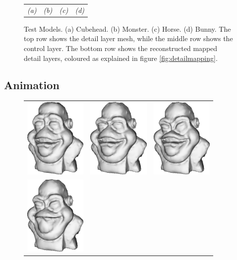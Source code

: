 \begin{figure}
\begin{center}
\begin{tabular}{cccc}
{\it (a)} & {\it (b)} & {\it (c)} & {\it (d)} 
\end{tabular}
\caption[Test Models]{\label{fig:models} Test Models. (a) Cubehead. (b) Monster. (c) Horse. (d) Bunny. The top row shows the detail layer mesh, while the middle row shows the control layer. The bottom row shows the reconstructed mapped detail layers, coloured as explained in figure \ref{fig:detailmapping}. }
\end{center}
\end{figure}

\subsection{\label{sec:scandata:results:animation} Animation}

\begin{figure}
\begin{center}
\begin{tabular}{ccc}
\includegraphics[width=3cm]{../images/mapanim_1} &
\includegraphics[width=3cm]{../images/mapanim_2} &
\includegraphics[width=3cm]{../images/mapanim_3} \\
\includegraphics[width=3cm]{../images/mapanim_4} &

\end{tabular}
\end{center}
\end{figure}
